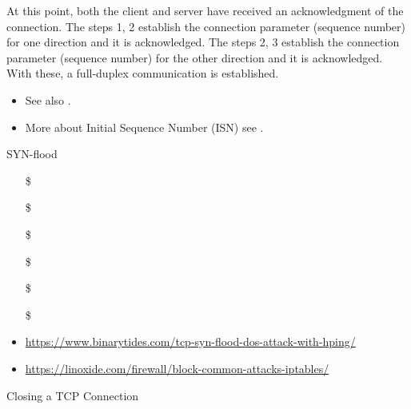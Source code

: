 At this point, both the client and server have received an acknowledgment of the
connection. The steps 1, 2 establish the connection parameter (sequence number) for one
direction and it is acknowledged. The steps 2, 3 establish the connection parameter
(sequence number) for the other direction and it is acknowledged. With these, a
full-duplex communication is established.

\begin{itemize}
\item See also .
\item More about Initial Sequence Number (ISN) see
  .
\end{itemize}

\begin{frame}{SYN-flood}
  \begin{itemize}
  \item[\$] 
  \item[\$] 
  \item[\$] 
  \item[\$] 
  \item[\$] 
  \item[\$] 
  \end{itemize}
\end{frame}

\begin{itemize}
\item \url{https://www.binarytides.com/tcp-syn-flood-dos-attack-with-hping/}
\item \url{https://linoxide.com/firewall/block-common-attacks-iptables/}
\end{itemize}

\begin{frame}{Closing a TCP Connection}
  \begin{center}
  \end{center}
  \label{fig:3way-close}
\end{frame}

